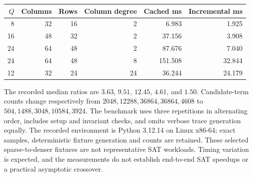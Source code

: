 \begin{center}\small
\begin{tabular}{rrrrrr}\toprule
$Q$ & Columns & Rows & Column degree & Cached ms & Incremental ms\\\midrule
8 &32&16&2&6.983&1.925\\
16&48&32&2&37.156&3.908\\
24&64&48&2&87.676&7.040\\
24&64&48&8&151.508&32.844\\
12&32&24&24&36.244&24.179\\\bottomrule
\end{tabular}
\end{center}
The recorded median ratios are $3.63$, $9.51$, $12.45$, $4.61$, and $1.50$. Candidate-term counts change respectively from $2048,12288,36864,36864,4608$ to $504,1488,3048,10584,3924$. The benchmark uses three repetitions in alternating order, includes setup and invariant checks, and omits verbose trace generation equally. The recorded environment is Python 3.12.14 on Linux x86-64; exact samples, deterministic fixture generation and counts are retained. These selected sparse-to-denser fixtures are not representative SAT workloads. Timing variation is expected, and the measurements do not establish end-to-end SAT speedups or a practical asymptotic crossover.
